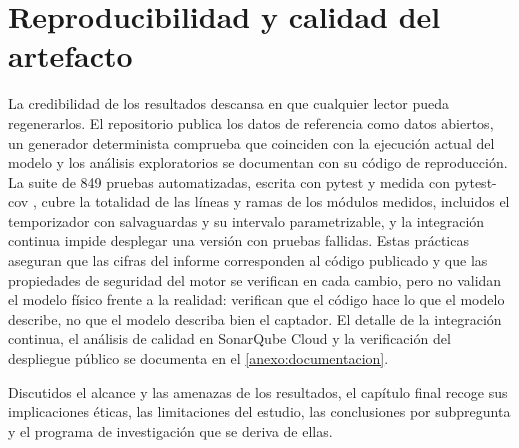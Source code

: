 \section{Reproducibilidad y calidad del artefacto}
La credibilidad de los resultados descansa en que cualquier lector pueda regenerarlos. El repositorio publica los datos de referencia como datos abiertos, un generador determinista comprueba que coinciden con la ejecuci\'on actual del modelo y los an\'alisis exploratorios se documentan con su c\'odigo de reproducci\'on. La suite de 849 pruebas automatizadas, escrita con pytest \parencite{pytest} y medida con pytest-cov \parencite{pytestcov}, cubre la totalidad de las l\'ineas y ramas de los m\'odulos medidos, incluidos el temporizador con salvaguardas y su intervalo parametrizable, y la integraci\'on continua impide desplegar una versi\'on con pruebas fallidas. Estas pr\'acticas aseguran que las cifras del informe corresponden al c\'odigo publicado y que las propiedades de seguridad del motor se verifican en cada cambio, pero no validan el modelo f\'isico frente a la realidad: verifican que el c\'odigo hace lo que el modelo describe, no que el modelo describa bien el captador. El detalle de la integraci\'on continua, el an\'alisis de calidad en SonarQube Cloud y la verificaci\'on del despliegue p\'ublico se documenta en el \cref{anexo:documentacion}.

Discutidos el alcance y las amenazas de los resultados, el cap\'itulo final recoge sus implicaciones \'eticas, las limitaciones del estudio, las conclusiones por subpregunta y el programa de investigaci\'on que se deriva de ellas.
